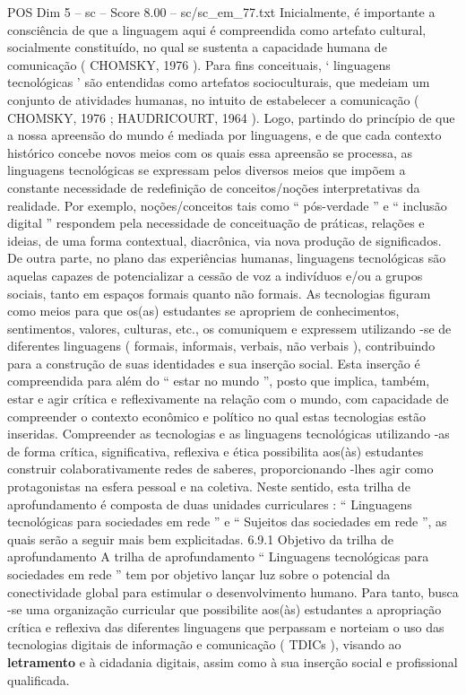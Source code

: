 \begin{textsample}{POS Dim 5 – sc – Score 8.00 – sc/sc\_em\_77.txt}
Inicialmente, é importante a consciência de que a linguagem aqui é compreendida como artefato cultural, socialmente constituído, no qual se sustenta a capacidade humana de comunicação ( CHOMSKY, 1976 ).
Para fins conceituais, ‘ linguagens tecnológicas ’ são entendidas como artefatos socioculturais, que medeiam um conjunto de atividades humanas, no intuito de estabelecer a comunicação ( CHOMSKY, 1976 ; HAUDRICOURT, 1964 ).
Logo, partindo do princípio de que a nossa apreensão do mundo é mediada por linguagens, e de que cada contexto histórico concebe novos meios com os quais essa apreensão se processa, as linguagens tecnológicas se expressam pelos diversos meios que impõem a constante necessidade de redefinição de conceitos/noções interpretativas da realidade.
Por exemplo, noções/conceitos tais como “ pós-verdade ” e “ inclusão digital ” respondem pela necessidade de conceituação de práticas, relações e ideias, de uma forma contextual, diacrônica, via nova produção de significados.
De outra parte, no plano das experiências humanas, linguagens tecnológicas são aquelas capazes de potencializar a cessão de voz a indivíduos e/ou a grupos sociais, tanto em espaços formais quanto não formais.
As tecnologias figuram como meios para que os(as) estudantes se apropriem de conhecimentos, sentimentos, valores, culturas, etc., os comuniquem e expressem utilizando -se de diferentes linguagens ( formais, informais, verbais, não verbais ), contribuindo para a construção de suas identidades e sua inserção social.
Esta inserção é compreendida para além do “ estar no mundo ”, posto que implica, também, estar e agir crítica e reflexivamente na relação com o mundo, com capacidade de compreender o contexto econômico e político no qual estas tecnologias estão inseridas.
Compreender as tecnologias e as linguagens tecnológicas utilizando -as de forma crítica, significativa, reflexiva e ética possibilita aos(às) estudantes construir colaborativamente redes de saberes, proporcionando -lhes agir como protagonistas na esfera pessoal e na coletiva.
Neste sentido, esta trilha de aprofundamento é composta de duas unidades curriculares : “ Linguagens tecnológicas para sociedades em rede ” e “ Sujeitos das sociedades em rede ”, as quais serão a seguir mais bem explicitadas. 6.9.1 Objetivo da trilha de aprofundamento A trilha de aprofundamento “ Linguagens tecnológicas para sociedades em rede ” tem por objetivo lançar luz sobre o potencial da conectividade global para estimular o desenvolvimento humano.
Para tanto, busca -se uma organização curricular que possibilite aos(às) estudantes a apropriação crítica e reflexiva das diferentes linguagens que perpassam e norteiam o uso das tecnologias digitais de informação e comunicação ( TDICs ), visando ao \textbf{letramento} e à cidadania digitais, assim como à sua inserção social e profissional qualificada.

\end{textsample}

